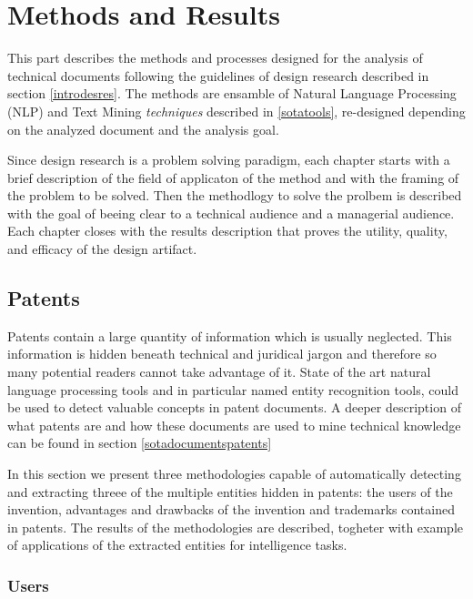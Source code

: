 \documentclass[]{book}
\begin{document}
\part{Methods and Results}\label{part-methods-and-results}

This part describes the methods and processes designed for the analysis
of technical documents following the guidelines of design research
described in section \ref{introdesres}. The methods are ensamble of
Natural Language Processing (NLP) and Text Mining \emph{techniques}
described in \ref{sotatools}, re-designed depending on the analyzed
document and the analysis goal.

Since design research is a problem solving paradigm, each chapter starts
with a brief description of the field of applicaton of the method and
with the framing of the problem to be solved. Then the methodlogy to
solve the prolbem is described with the goal of beeing clear to a
technical audience and a managerial audience. Each chapter closes with
the results description that proves the utility, quality, and efficacy
of the design artifact.

\chapter{Patents}\label{patents}

Patents contain a large quantity of information which is usually
neglected. This information is hidden beneath technical and juridical
jargon and therefore so many potential readers cannot take advantage of
it. State of the art natural language processing tools and in particular
named entity recognition tools, could be used to detect valuable
concepts in patent documents. A deeper description of what patents are
and how these documents are used to mine technical knowledge can be
found in section \ref{sotadocumentspatents}

In this section we present three methodologies capable of automatically
detecting and extracting threee of the multiple entities hidden in
patents: the users of the invention, advantages and drawbacks of the
invention and trademarks contained in patents. The results of the
methodologies are described, togheter with example of applications of
the extracted entities for intelligence tasks.

\section{Users}\label{usersresults}
\end{document}
